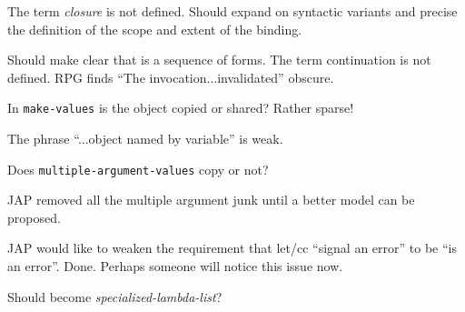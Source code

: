 \label{subsubsec:variable-binding}
%
\begin{optPrivate}
    The term {\em closure} is not defined.  Should expand on syntactic variants
    and precise the definition of the scope and extent of the binding.

    Should make clear that  is a sequence of forms.  The term
    continuation is not defined.  RPG finds ``The invocation...invalidated''
    obscure.

    In {\tt make-values} is the object copied or shared?  Rather sparse!

    The phrase ``...object named by variable'' is weak.

    Does {\tt multiple-argument-values} copy or not?

    JAP removed all the multiple argument junk until a better model can be
    proposed.

    JAP would like to weaken the requirement that let/cc ``signal an error'' to
    be ``is an error''.  Done.  Perhaps someone will notice this issue now.

    Should  become {\em specialized-lambda-list}?
\end{optPrivate}
%
